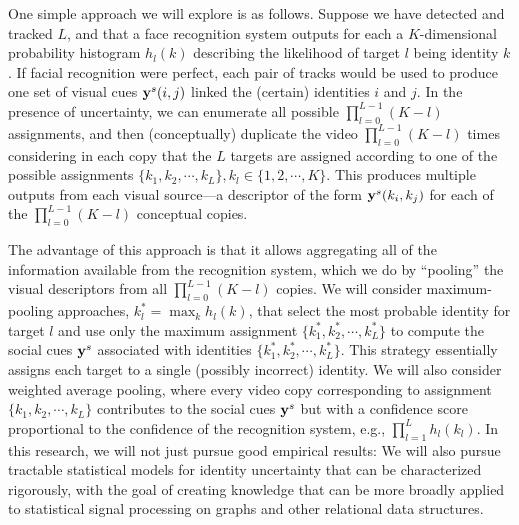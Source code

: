 
One simple approach we will explore is as follows. Suppose we have detected and tracked $L$, and that a face recognition system outputs for each a $K$-dimensional probability histogram $h_l(k)$ describing the likelihood of target $l$ being identity $k$. If facial recognition were perfect, each pair of  tracks would be used to produce one set of visual cues ${\bf y}^s(i,j)$ linked the (certain) identities $i$ and $j$. In the presence of uncertainty, we can enumerate all possible $\prod_{l=0}^{L-1}(K-l)$  assignments, and then (conceptually) duplicate the video $\prod_{l=0}^{L-1}(K-l)$ times considering in each copy that the $L$ targets are assigned according to one of the possible assignments $\{k_1, k_2, \cdots, k_L\}, k_l\in\{1,2, \cdots, K\}$. This produces multiple outputs from each visual source---a descriptor of the form ${\bf y}^s(k_i,k_j)$ for each of the $\prod_{l=0}^{L-1}(K-l)$ conceptual copies. 

The advantage of this approach is that it allows aggregating all of the information available from the recognition system, which we do by ``pooling'' the visual descriptors from all $\prod_{l=0}^{L-1}(K-l)$ copies. We will consider maximum-pooling approaches, $k_l^{*}=\max_{k}h_l(k)$, that select the most probable identity for target $l$ and use only the maximum assignment $\{k_1^{*}, k_2^{*}, \cdots, k_L^{*}\}$ to compute the social cues ${\bf y}^s$ associated with identities $\{k_1^{*}, k_2^{*}, \cdots, k_L^{*}\}$. This strategy essentially assigns each target to a single (possibly incorrect) identity. We will also consider weighted average pooling, where every video copy corresponding to assignment $\{k_1, k_2, \cdots, k_L\}$ contributes to the social cues ${\bf y}^s$ but with a confidence score proportional to the confidence of the recognition system, e.g., $\prod_{l=1}^{L}h_l(k_l)$. In this research, we will not just pursue good empirical results: We will also pursue tractable statistical models for identity uncertainty that can be characterized rigorously, with the goal of creating knowledge that can be more broadly applied to statistical signal processing on graphs and other relational data structures. 